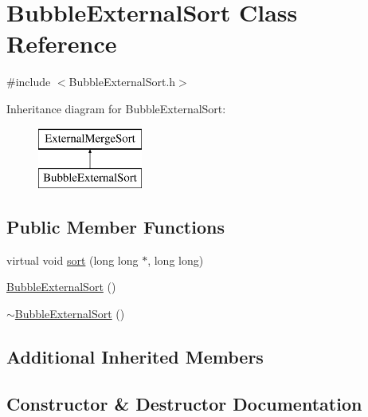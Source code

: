 \hypertarget{class_bubble_external_sort}{}\section{Bubble\+External\+Sort Class Reference}
\label{class_bubble_external_sort}


{\ttfamily \#include $<$Bubble\+External\+Sort.\+h$>$}

Inheritance diagram for Bubble\+External\+Sort\+:\begin{figure}[H]
\begin{center}
\leavevmode
\includegraphics[height=2.000000cm]{class_bubble_external_sort}
\end{center}
\end{figure}
\subsection*{Public Member Functions}
\begin{DoxyCompactItemize}
\item 
virtual void \hyperlink{class_bubble_external_sort_ac2c8c1a8dad0f0f99a176d3641b7625c}{sort} (long long $\ast$, long long)
\item 
\hyperlink{class_bubble_external_sort_a420f93ff7677a75557f805749011f86e}{Bubble\+External\+Sort} ()
\item 
\hyperlink{class_bubble_external_sort_a2075c6e2117da937f397ceb993336e81}{$\sim$\+Bubble\+External\+Sort} ()
\end{DoxyCompactItemize}
\subsection*{Additional Inherited Members}


\subsection{Constructor \& Destructor Documentation}
\hypertarget{class_bubble_external_sort_a420f93ff7677a75557f805749011f86e}{}\label{class_bubble_external_sort_a420f93ff7677a75557f805749011f86e} 
